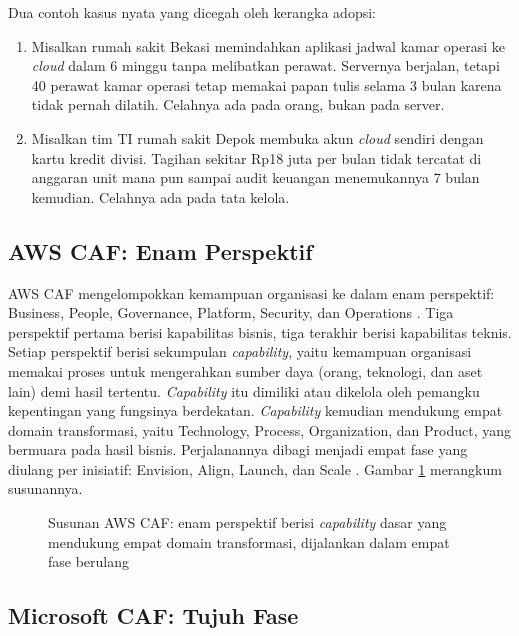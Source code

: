 Dua contoh kasus nyata yang dicegah oleh kerangka adopsi:
\begin{enumerate}
  \item Misalkan rumah sakit Bekasi memindahkan aplikasi jadwal kamar operasi ke
        \textit{cloud} dalam 6 minggu tanpa melibatkan perawat. Servernya berjalan, tetapi
        40 perawat kamar operasi tetap memakai papan tulis selama 3 bulan karena tidak
        pernah dilatih. Celahnya ada pada orang, bukan pada server.
  \item Misalkan tim TI rumah sakit Depok membuka akun \textit{cloud} sendiri dengan kartu
        kredit divisi. Tagihan sekitar Rp18 juta per bulan tidak tercatat di anggaran unit
        mana pun sampai audit keuangan menemukannya 7 bulan kemudian. Celahnya ada pada
        tata kelola.
\end{enumerate}

\subsection*{AWS CAF: Enam Perspektif}

AWS CAF mengelompokkan kemampuan organisasi ke dalam enam perspektif: Business, People,
Governance, Platform, Security, dan Operations \cite{c04-aws-caf-capabilities}. Tiga
perspektif pertama berisi kapabilitas bisnis, tiga terakhir berisi kapabilitas teknis.
Setiap perspektif berisi sekumpulan \textit{capability}, yaitu kemampuan organisasi
memakai proses untuk mengerahkan sumber daya (orang, teknologi, dan aset lain) demi hasil
tertentu. \textit{Capability} itu dimiliki atau dikelola oleh pemangku kepentingan yang
fungsinya berdekatan. \textit{Capability} kemudian mendukung empat domain transformasi,
yaitu Technology, Process, Organization, dan Product, yang bermuara pada hasil bisnis.
Perjalanannya dibagi menjadi empat fase yang diulang per inisiatif: Envision, Align,
Launch, dan Scale \cite{awscaf}. Gambar \ref{fig:ch04-struktur-aws-caf} merangkum
susunannya.

\begin{figure}[!htb]
  \centering
  
  \caption{Susunan AWS CAF: enam perspektif berisi \textit{capability} dasar yang
           mendukung empat domain transformasi, dijalankan dalam empat fase berulang}
  \label{fig:ch04-struktur-aws-caf}
\end{figure}

\subsection*{Microsoft CAF: Tujuh Fase}

